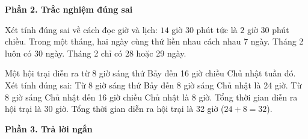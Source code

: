 \textbf{Phần 2. Trắc nghiệm đúng sai}

\begin{ex} %
Xét tính đúng sai về cách đọc giờ và lịch:
\choiceTF
{\True $14$ giờ $30$ phút tức là $2$ giờ $30$ phút chiều.}
{\True Trong một tháng, hai ngày cùng thứ liền nhau cách nhau 7 ngày.}
{Tháng 2 luôn có 30 ngày.}
{\True Tháng 2 chỉ có 28 hoặc 29 ngày.}
\end{ex}

\begin{ex} %
Một hội trại diễn ra từ 8 giờ sáng thứ Bảy đến 16 giờ chiều Chủ nhật tuần đó. Xét tính đúng sai:
\choiceTF
{\True Từ 8 giờ sáng thứ Bảy đến 8 giờ sáng Chủ nhật là 24 giờ.}
{\True Từ 8 giờ sáng Chủ nhật đến 16 giờ chiều Chủ nhật là 8 giờ.}
{Tổng thời gian diễn ra hội trại là 30 giờ.}
{\True Tổng thời gian diễn ra hội trại là 32 giờ ($24 + 8 = 32$).}
\end{ex}

\textbf{Phần 3. Trả lời ngắn}

